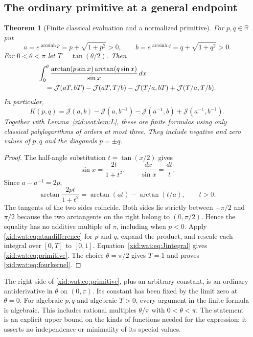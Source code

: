 \documentclass[11pt,a4paper]{article}
\numberwithin{equation}{section}
\newtheorem{theorem}{Theorem}[section]
\theoremstyle{definition}
\theoremstyle{remark}
\begin{document}
\subsection{The ordinary primitive at a general endpoint}

\begin{theorem}[Finite classical evaluation and a normalized primitive]
\label{xid:wat:thm:primitive}
For $p,q\in\mathbb R$ put
\[
 a=e^{\operatorname{arcsinh}p}=p+\sqrt{1+p^2}>0,
 \qquad
 b=e^{\operatorname{arcsinh}q}=q+\sqrt{1+q^2}>0.
\]
For $0<\theta<\pi$ let $T=\tan(\theta/2)$. Then
\begin{align}\label{xid:wat:eq:primitive}
 &\int_0^\theta
   \frac{\arctan(p\sin x)\arctan(q\sin x)}{\sin x}\,dx
       \notag\\
 &\quad=\mathcal J(aT,bT)-\mathcal J(aT,T/b)
           -\mathcal J(T/a,bT)+\mathcal J(T/a,T/b).
\end{align}
In particular,
\begin{equation}\label{xid:wat:eq:fourkernel}
 \boxed{K(p,q)=\mathcal J(a,b)-\mathcal J(a,b^{-1})
       -\mathcal J(a^{-1},b)+\mathcal J(a^{-1},b^{-1}).}
\end{equation}
Together with Lemma~\ref{xid:wat:lem:L}, these are finite formulas using
only classical polylogarithms of orders at most three. They include
negative and zero values of $p,q$ and the diagonals $p=\pm q$.
\end{theorem}

\begin{proof}
The half-angle substitution $t=\tan(x/2)$ gives
\[
 \sin x=\frac{2t}{1+t^2},\qquad \frac{dx}{\sin x}=\frac{dt}{t}.
\]
Since $a-a^{-1}=2p$,
\begin{equation}\label{xid:wat:eq:atandifference}
 \arctan\frac{2pt}{1+t^2}
       =\arctan(at)-\arctan(t/a),\qquad t>0.
\end{equation}
The tangents of the two sides coincide. Both sides lie strictly
between $-\pi/2$ and $\pi/2$ because the two arctangents on the right
belong to $(0,\pi/2)$. Hence the equality has no additive multiple
of $\pi$, including when $p<0$.
Apply \eqref{xid:wat:eq:atandifference} for $p$ and $q$, expand the
product, and rescale each integral over $[0,T]$ to $[0,1]$.
Equation~\eqref{xid:wat:eq:Jintegral} gives \eqref{xid:wat:eq:primitive}.
The choice $\theta=\pi/2$ gives $T=1$ and proves
\eqref{xid:wat:eq:fourkernel}.
\end{proof}

The right side of \eqref{xid:wat:eq:primitive}, plus an arbitrary constant,
is an ordinary antiderivative in $\theta$ on $(0,\pi)$. Its constant
has been fixed by the limit zero at $\theta=0$. For algebraic $p,q$
and algebraic $T>0$, every argument in the finite formula is algebraic.
This includes rational multiples $\theta/\pi$ with $0<\theta<\pi$.
The statement is an explicit upper bound on the kinds of functions
needed for the expression; it asserts no independence or minimality
of its special values.
\end{document}
